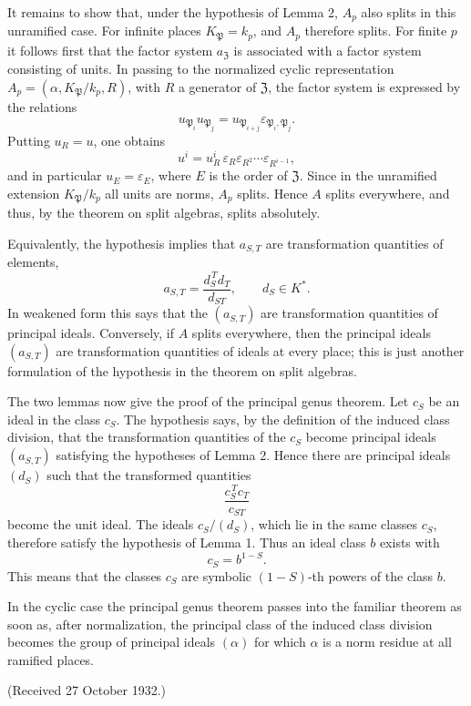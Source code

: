 \documentclass[11pt]{article}
\providecommand{\PP}{\mathfrak P}
\begin{document}
It remains to show that, under the hypothesis of Lemma 2, \(A_p\) also splits in this unramified case. For infinite places \(K_\PP=k_p\), and \(A_p\) therefore splits. For finite \(p\) it follows first that the factor system \(a_{\mathfrak Z}\) is associated with a factor system consisting of units. In passing to the normalized cyclic representation \(A_p=(\alpha,K_\PP/k_p,R)\), with \(R\) a generator of \(\mathfrak Z\), the factor system is expressed by the relations
\[
        u_{\PP_i}u_{\PP_j}=u_{\PP_{i+j}}\varepsilon_{\PP_i,\PP_j}.
\]
Putting \(u_R=u\), one obtains
\[
        u^i=u_R^i\,\varepsilon_R\varepsilon_{R^2}\cdots \varepsilon_{R^{i-1}},
\]
and in particular \(u_E=\varepsilon_E\), where \(E\) is the order of \(\mathfrak Z\). Since in the unramified extension \(K_\PP/k_p\) all units are norms, \(A_p\) splits. Hence \(A\) splits everywhere, and thus, by the theorem on split algebras, splits absolutely.

Equivalently, the hypothesis implies that \(a_{S,T}\) are transformation quantities of elements,
\[
        a_{S,T}=\frac{d_S^{\,T}d_T}{d_{ST}},
        \qquad d_S\in K^*.
\]
In weakened form this says that the \((a_{S,T})\) are transformation quantities of principal ideals. Conversely, if \(A\) splits everywhere, then the principal ideals \((a_{S,T})\) are transformation quantities of ideals at every place; this is just another formulation of the hypothesis in the theorem on split algebras.

The two lemmas now give the proof of the principal genus theorem. Let \(c_S\) be an ideal in the class \(c_S\). The hypothesis says, by the definition of the induced class division, that the transformation quantities of the \(c_S\) become principal ideals \((a_{S,T})\) satisfying the hypotheses of Lemma 2. Hence there are principal ideals \((d_S)\) such that the transformed quantities
\[
        \frac{c_S^{\,T}c_T}{c_{ST}}
\]
become the unit ideal. The ideals \(c_S/(d_S)\), which lie in the same classes \(c_S\), therefore satisfy the hypothesis of Lemma 1. Thus an ideal class \(b\) exists with
\[
        c_S=b^{1-S}.
\]
This means that the classes \(c_S\) are symbolic \((1-S)\)-th powers of the class \(b\).

In the cyclic case the principal genus theorem passes into the familiar theorem as soon as, after normalization, the principal class of the induced class division becomes the group of principal ideals \((\alpha)\) for which \(\alpha\) is a norm residue at all ramified places.

\begin{center}
(Received 27 October 1932.)
\end{center}
\end{document}
